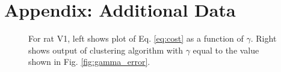 \documentclass[superscriptaddress, twocolumn, prl]{revtex4}
\begin{document}
\section{\label{App:add_data}Appendix: Additional Data}
\begin{figure}[ht]
\centering
{}
\caption{For rat V1, left shows plot of Eq. \ref{eq:cost} as a function of $\gamma$. Right shows output of clustering algorithm with $\gamma$ equal to the value shown in Fig. \ref{fig:gamma_error}.}
\end{figure}
\end{document}
